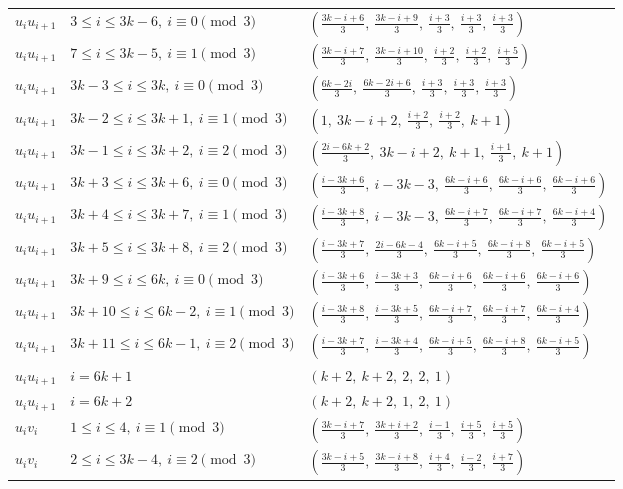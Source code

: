 \begin{longtable}{lll}
$u_i u_{i+1}$ & $3 \le i \le 3k-6,\ i \equiv 0 \pmod{3}$ & $(\frac{3k-i+6}{3},\ \frac{3k-i+9}{3},\ \frac{i+3}{3},\ \frac{i+3}{3},\ \frac{i+3}{3})$ \\
$u_i u_{i+1}$ & $7 \le i \le 3k-5,\ i \equiv 1 \pmod{3}$ & $(\frac{3k-i+7}{3},\ \frac{3k-i+10}{3},\ \frac{i+2}{3},\ \frac{i+2}{3},\ \frac{i+5}{3})$ \\
$u_i u_{i+1}$ & $3k-3 \le i \le 3k,\ i \equiv 0 \pmod{3}$ & $(\frac{6k-2i}{3},\ \frac{6k-2i+6}{3},\ \frac{i+3}{3},\ \frac{i+3}{3},\ \frac{i+3}{3})$ \\
$u_i u_{i+1}$ & $3k-2 \le i \le 3k+1,\ i \equiv 1 \pmod{3}$ & $(1,\ 3k-i+2,\ \frac{i+2}{3},\ \frac{i+2}{3},\ k+1)$ \\
$u_i u_{i+1}$ & $3k-1 \le i \le 3k+2,\ i \equiv 2 \pmod{3}$ & $(\frac{2i-6k+2}{3},\ 3k-i+2,\ k+1,\ \frac{i+1}{3},\ k+1)$ \\
$u_i u_{i+1}$ & $3k+3 \le i \le 3k+6,\ i \equiv 0 \pmod{3}$ & $(\frac{i-3k+6}{3},\ i-3k-3,\ \frac{6k-i+6}{3},\ \frac{6k-i+6}{3},\ \frac{6k-i+6}{3})$ \\
$u_i u_{i+1}$ & $3k+4 \le i \le 3k+7,\ i \equiv 1 \pmod{3}$ & $(\frac{i-3k+8}{3},\ i-3k-3,\ \frac{6k-i+7}{3},\ \frac{6k-i+7}{3},\ \frac{6k-i+4}{3})$ \\
$u_i u_{i+1}$ & $3k+5 \le i \le 3k+8,\ i \equiv 2 \pmod{3}$ & $(\frac{i-3k+7}{3},\ \frac{2i-6k-4}{3},\ \frac{6k-i+5}{3},\ \frac{6k-i+8}{3},\ \frac{6k-i+5}{3})$ \\
$u_i u_{i+1}$ & $3k+9 \le i \le 6k,\ i \equiv 0 \pmod{3}$ & $(\frac{i-3k+6}{3},\ \frac{i-3k+3}{3},\ \frac{6k-i+6}{3},\ \frac{6k-i+6}{3},\ \frac{6k-i+6}{3})$ \\
$u_i u_{i+1}$ & $3k+10 \le i \le 6k-2,\ i \equiv 1 \pmod{3}$ & $(\frac{i-3k+8}{3},\ \frac{i-3k+5}{3},\ \frac{6k-i+7}{3},\ \frac{6k-i+7}{3},\ \frac{6k-i+4}{3})$ \\
$u_i u_{i+1}$ & $3k+11 \le i \le 6k-1,\ i \equiv 2 \pmod{3}$ & $(\frac{i-3k+7}{3},\ \frac{i-3k+4}{3},\ \frac{6k-i+5}{3},\ \frac{6k-i+8}{3},\ \frac{6k-i+5}{3})$ \\
$u_i u_{i+1}$ & $i = 6k+1$ & $(k+2,\ k+2,\ 2,\ 2,\ 1)$ \\
$u_i u_{i+1}$ & $i = 6k+2$ & $(k+2,\ k+2,\ 1,\ 2,\ 1)$ \\
$u_i v_i$ & $1 \le i \le 4,\ i \equiv 1 \pmod{3}$ & $(\frac{3k-i+7}{3},\ \frac{3k+i+2}{3},\ \frac{i-1}{3},\ \frac{i+5}{3},\ \frac{i+5}{3})$ \\
$u_i v_i$ & $2 \le i \le 3k-4,\ i \equiv 2 \pmod{3}$ & $(\frac{3k-i+5}{3},\ \frac{3k-i+8}{3},\ \frac{i+4}{3},\ \frac{i-2}{3},\ \frac{i+7}{3})$ \\

\end{longtable}
